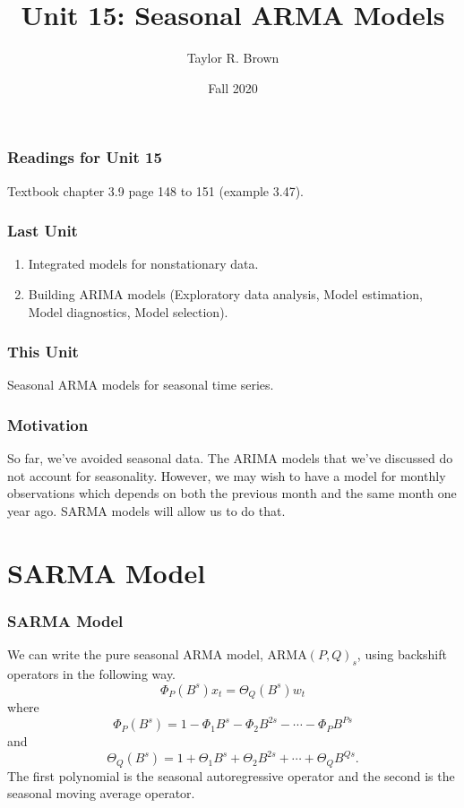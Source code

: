 \documentclass[%
xcolor=pdftex]{beamer}
\title{Unit 15: Seasonal ARMA Models}
\author[STAT 5170: Applied Time Series, Unit 15]{Taylor R. Brown}
\institute{Department of Statistics, University of Virginia}
\date{Fall 2020}
\begin{document}
\frame{\titlepage}


\begin{frame}
\frametitle{Readings for Unit 15}

Textbook chapter 3.9 page 148 to 151 (example 3.47).

\end{frame}



\begin{frame}
\frametitle{Last Unit}
\begin{enumerate}
\item Integrated models for nonstationary data.
\item Building ARIMA models (Exploratory data analysis, Model estimation, Model diagnostics, Model selection).
\end{enumerate}
\end{frame}

\begin{frame}
\frametitle{This Unit}

Seasonal ARMA models for seasonal time series.


\end{frame}


\begin{frame}
\frametitle{Motivation}

So far, we've avoided seasonal data. The ARIMA models that we've discussed do not account for seasonality. However, we may wish to have a model for monthly observations which depends on both the previous month and the same month one year ago. SARMA models will allow us to do that.

\end{frame}

\section{SARMA Model}
\frame{\tableofcontents[currentsection]}

\begin{frame}
\frametitle{SARMA Model}

We can write the pure seasonal ARMA model, ARMA$(P,Q)_s$, using backshift operators in the following way.
\begin{equation}
\Phi_P (B^s) x_t =\Theta_Q(B^s) w_t
\end{equation}
where
$$
\Phi_P(B^s)=1-\Phi_1 B^s-\Phi_2B^{2s}-\cdots-\Phi_P B^{Ps}
$$
and
$$
\Theta_Q(B^s)=1+\Theta_1 B^s+\Theta_2B^{2s}+\cdots+\Theta_Q B^{Qs}.
$$
The first polynomial is the seasonal autoregressive operator and the second is the seasonal moving average operator.



\end{frame}
\end{document}
